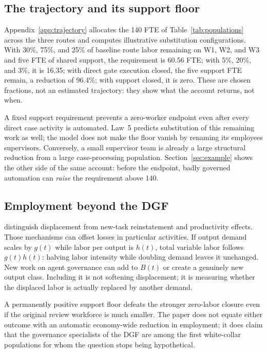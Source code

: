\subsection{The trajectory and its support floor}

Appendix~\ref{app:trajectory} allocates the 140 FTE of Table~\ref{tab:populations} across the three
routes and computes illustrative substitution configurations. With 30\%, 75\%, and 25\% of baseline
route labor remaining on W1, W2, and W3 and five FTE of shared support, the requirement is 60.56 FTE;
with 5\%, 20\%, and 3\%, it is 16.35; with direct gate execution closed, the five support FTE remain,
a reduction of 96.4\%; with support closed, it is zero. These are chosen fractions, not an estimated
trajectory: they show what the account returns, not when.

A fixed support requirement prevents a zero-worker endpoint even after every direct case activity is
automated. Law~5 predicts substitution of this remaining work as well; the model does not make the
floor vanish by renaming its employees supervisors. Conversely, a small supervisor team is already a
large structural reduction from a large case-processing population. Section~\ref{sec:example} shows the
other side of the same account: before the endpoint, badly governed automation can \emph{raise} the
requirement above 140.

\subsection{Employment beyond the DGF}

\citet{acemoglu2019} distinguish displacement from new-task reinstatement and productivity effects.
Those mechanisms can offset losses in particular activities. If output demand scales by $g(t)$ while
labor per output is $h(t)$, total variable labor follows $g(t)h(t)$: halving labor intensity while
doubling demand leaves it unchanged. New work on agent governance can add to $B(t)$ or create a
genuinely new output class. Including it is not softening displacement; it is measuring whether the
displaced labor is actually replaced by another demand.

A permanently positive support floor defeats the
stronger zero-labor closure even if the original review workforce is much smaller. The paper does not
equate either outcome with an automatic economy-wide reduction in employment; it does claim that the
governance specialists of the DGF are among the first white-collar populations for whom the question
stops being hypothetical.
